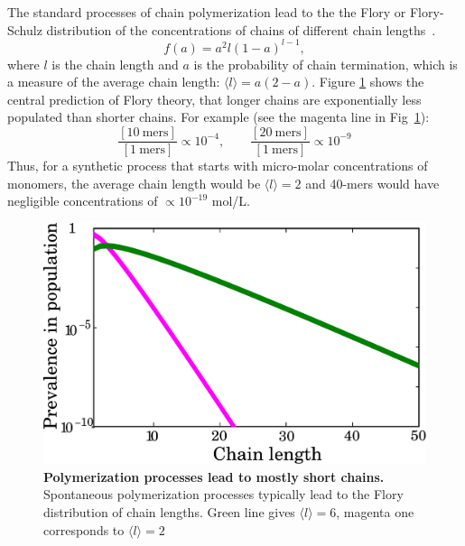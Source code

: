 \documentclass[journal=jacsat,manuscript=article,layout=twocolumn]{achemso}
\newcommand*{\pq}[1]{\left[ #1 \right]}
\begin{document}
The standard processes of chain polymerization lead to the the Flory or 
Flory-Schulz distribution of the concentrations of chains of different chain 
lengths~\cite{Flory1953}. 
\begin{equation}
 f(a)=a^2l(1-a)^{l-1},\label{eq:flory}
\end{equation} 
where $l$ is the chain length and $a$ is the probability of chain termination, 
which is a measure of the average chain length: $\langle l \rangle = a(2- a)$.
Figure \ref{fig:flory} shows the central prediction of Flory theory, that 
longer chains are exponentially less populated than shorter chains.  For example (see the magenta 
line 
in Fig~\ref{fig:flory}):
\begin{equation}  
\frac{\pq{10~\mathrm{mers}}}{\pq{1~\mathrm{mers}}}\propto10^{-4},\qquad\frac{\pq{20~\mathrm{mers}}}
{
\pq{1~\mathrm{mers}}}\propto10^{-9}
\end{equation} 
Thus, for a synthetic process that starts with micro-molar concentrations of monomers, the 
average chain length would be $\langle l \rangle = 2$ and 40-mers would have 
negligible concentrations of $\propto 10^{-19} $ mol/L. 
\begin{figure}[h!]
  \centering
  \includegraphics[width=\columnwidth]{pictures/flory2.pdf} 
  \caption{\textbf{Polymerization processes lead to mostly short chains.}  Spontaneous 
polymerization processes typically lead to the Flory distribution of chain lengths. 
Green line gives $\langle  l \rangle= 6$, magenta one corresponds to $\langle l \rangle=2$}
  \label{fig:flory}
\end{figure}
\end{document}
